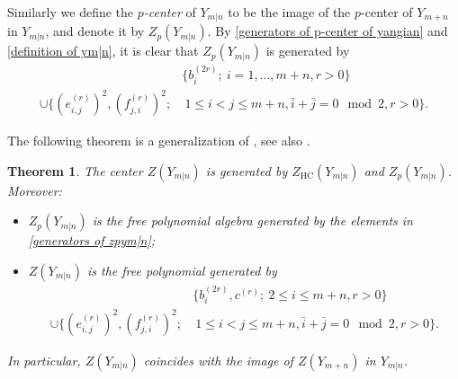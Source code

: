 \documentclass[12pt,reqno]{amsart}
\DeclareMathOperator{\HC}{HC}
\numberwithin{equation}{section}
\newtheorem{Theorem}{Theorem}[section]
\theoremstyle{Theorem}
\theoremstyle{remark}
\numberwithin{equation}{section}
\begin{document}
Similarly we define the {\it $p$-center} of $Y_{m|n}$ to be the image of the $p$-center of $Y_{m+n}$ in $Y_{m|n}$, and denote it by $Z_p(Y_{m|n})$.
By \eqref{generators of p-center of yangian} and \eqref{definition of ym|n}, 
it is clear that $Z_p(Y_{m|n})$ is generated by 
\begin{equation}
\begin{aligned}\label{generators of zpym|n}
&\{b_i^{(2r)};~i=1,\dots,m+n,r>0\}\\
\cup\{(e_{i,j}^{(r)})^2,(f_{j,i}^{(r)})^2;&~1\leq i<j\leq m+n, \bar i+\bar j=0\!\!\!\!\! \mod 2, r>0\}.      
\end{aligned}
\end{equation}

The following theorem is a generalization of \cite[Theorem 5.11]{BT18}, see also \cite[Theorem 4.8]{CH23}.
\begin{Theorem}
The center $Z(Y_{m|n})$ is generated by $Z_{\HC}(Y_{m|n})$ and $Z_p(Y_{m|n})$.
Moreover:
\begin{itemize}
 \item[(1)] $Z_p(Y_{m|n})$ is the free polynomial algebra generated by the elements in \eqref{generators of zpym|n};
 \item[(2)] $Z(Y_{m|n})$ is the free polynomial generated by
 \begin{equation}
\begin{aligned}\label{free generators of zym|n}
&\{b_i^{(2r)}, c^{(r)};~2\leq i\leq m+n,r>0\}\\
\cup\{(e_{i,j}^{(r)})^2,(f_{j,i}^{(r)})^2;&~1\leq i<j\leq m+n, \bar i+\bar j=0\!\!\!\!\! \mod 2, r>0\}.      
\end{aligned}
\end{equation}
\end{itemize}
In particular, 
$Z({Y_{m|n}})$ coincides with the image of $Z(Y_{m+n})$ in $Y_{m|n}$.
\end{Theorem}
\end{document}
